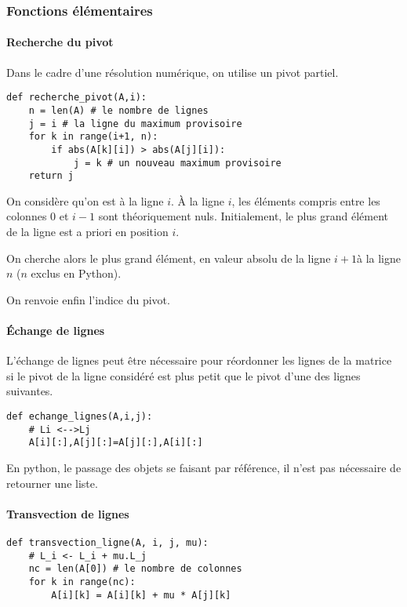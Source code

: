 {\subsubsection{Fonctions élémentaires}
\paragraph*{Recherche du pivot}
Dans le cadre d'une résolution numérique, on utilise un pivot partiel. 

\begin{lstlisting}
def recherche_pivot(A,i):
    n = len(A) # le nombre de lignes
    j = i # la ligne du maximum provisoire
    for k in range(i+1, n):
        if abs(A[k][i]) > abs(A[j][i]):
            j = k # un nouveau maximum provisoire
    return j
\end{lstlisting}


On considère qu'on est à la ligne $i$. \`A la ligne $i$, les éléments compris entre les colonnes 0 et $i-1$ sont théoriquement nuls. Initialement, le plus grand élément de la ligne est a priori en position $i$. 

On cherche alors le plus grand élément, en valeur absolu de la ligne $i+1$à la ligne $n$ ($n$ exclus en Python). 

On renvoie enfin l'indice du pivot. 

\paragraph*{Échange de lignes}

L'échange de lignes peut être nécessaire pour réordonner les lignes de la matrice si le pivot de la ligne considéré est plus petit que le pivot d'une des lignes suivantes.  

\begin{lstlisting}
def echange_lignes(A,i,j):
    # Li <-->Lj
    A[i][:],A[j][:]=A[j][:],A[i][:]
\end{lstlisting}

\begin{remarque}
En python, le passage des objets se faisant par référence, il n'est pas nécessaire de retourner une liste. 
\end{remarque}

\paragraph*{Transvection de lignes}

\begin{lstlisting}
def transvection_ligne(A, i, j, mu):
    # L_i <- L_i + mu.L_j 
    nc = len(A[0]) # le nombre de colonnes
    for k in range(nc):
        A[i][k] = A[i][k] + mu * A[j][k]
\end{lstlisting}

}
